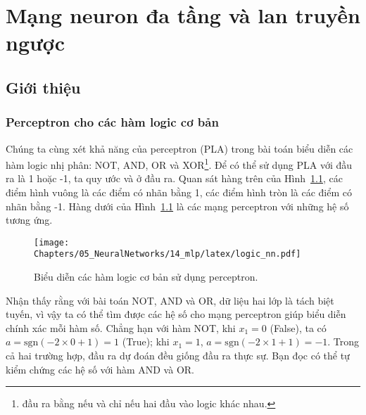 \chapter{Mạng neuron đa tầng và lan truyền ngược}
\label{cha:mlp}
 
 
 
\section{Giới thiệu}
 
 
 
\subsection{Perceptron cho các hàm logic cơ bản}
 
Chúng ta cùng xét khả năng của perceptron (PLA) trong bài toán biểu
diễn các hàm logic nhị phân: NOT, AND, OR và XOR\footnote{đầu ra bằng 
nếu và chỉ nếu hai đầu vào logic khác nhau.}. Để có thể sử dụng PLA với
đầu ra là 1 hoặc -1, ta quy ước  và  ở đầu ra. Quan sát hàng trên của Hình~\ref{fig:14_1}, các điểm
hình vuông là các điểm có nhãn bằng 1, các điểm hình tròn là các
điểm có nhãn bằng -1. Hàng dưới của Hình~\ref{fig:14_1} là các mạng
perceptron với những hệ số tương ứng.
\begin{figure}[t]
 \vspace{.1in}
\centering
    \texttt{[image: Chapters/05\_NeuralNetworks/14\_mlp/latex/logic\_nn.pdf]}
    \caption[]{Biểu diễn các hàm logic cơ bản sử dụng perceptron.}
    \label{fig:14_1}
\end{figure}
Nhận thấy rằng với bài toán NOT, AND và OR, dữ liệu hai lớp là tách biệt tuyến, vì vậy ta có thể tìm được các hệ số cho mạng perceptron giúp biểu diễn
chính xác mỗi hàm số. Chẳng hạn với hàm NOT, khi $x_1 = 0$ (False), ta có $a =
\text{sgn}(-2 \times 0+1) = 1$ (True); khi $x_1 = 1$, $a = \text{sgn}(-2\times 1 + 1) =
-1$. Trong cả hai trường hợp, đầu ra dự đoán đều giống đầu ra thực sự. Bạn
đọc có thể tự kiểm chứng các hệ số với hàm AND và OR.

